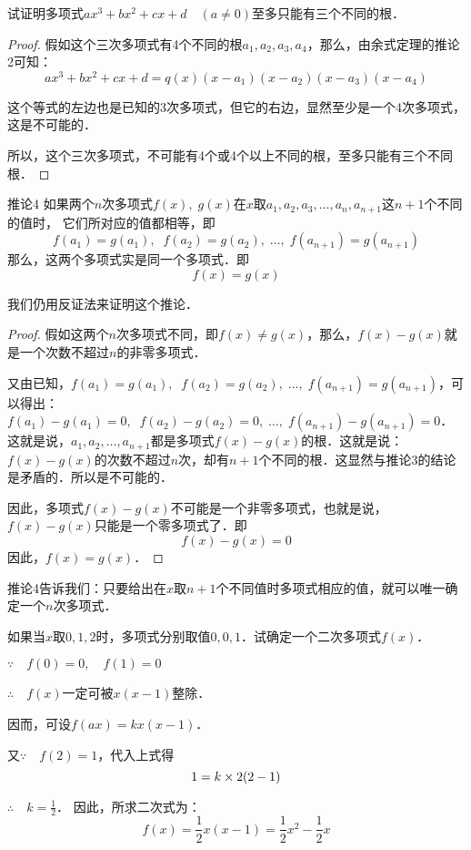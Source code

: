 \begin{example}
    试证明多项式$ax^3+bx^2+cx+d\quad (a\ne 0)$至多只能有三个不同的根．
\end{example}


\begin{proof}
    假如这个三次多项式有4个不同的根$a_1,a_2,a_3,a_4$，那么，由余式定理的推论2可知：
\[ax^3+bx^2+cx+d=q (x) (x-a_1) (x-a_2) (x-a_3) (x-a_4)\]

这个等式的左边也是已知的3次多项式，但它的右边，显然至少是一个4次多项式，这是不可能的．

所以，这个三次多项式，不可能有4个或4个以上不同的根，至多只能有三个不同根．
\end{proof}


\begin{blk}{推论4}
    如果两个$n$次多项式$f(x),\; g(x)$在$x$取$a_1,a_2,a_3,\ldots,a_n,a_{n+1}$这$n+1$个不同的值时，
    它们所对应的值都相等，即
\[f (a_1) =g (a_1) ,\; \; f (a_2) =g (a_2) ,\;  \ldots,\;  f (a_{n+1}) =g (a_{n+1}) \]
那么，这两个多项式实是同一个多项式．即
\[f (x) =g (x) \]
\end{blk}

我们仍用反证法来证明这个推论．

\begin{proof}
假如这两个$n$次多项式不同，即$f(x)\ne g(x)$，那么，$f(x)-g(x)$就是一个次数不超过$n$的非零多项式．

又由已知，$f (a_1) =g (a_1) ,\; \; f (a_2) =g (a_2) ,\;  \ldots,\;  f (a_{n+1}) =g (a_{n+1})$，可以得出：$f (a_1) -g (a_1)=0 ,\; \; f (a_2) -g (a_2)=0 ,\;  \ldots,\;  f (a_{n+1}) -g (a_{n+1})=0$．这就是说，$a_1,a_2,\ldots,a_{n+1}$都是多项式$f(x)-g(x)$的根．这就是说：$f(x)-g(x)$的次数不超过$n$次，却有$n+1$个不同的根．这显然与推论3的结论是矛盾的．所以是不可能的．

因此，多项式$f(x)-g(x)$不可能是一个非零多项式，也就是说，$f(x)-g(x)$只能是一个零多项式了．即
\[f (x) -g (x) =0\]
因此，$f(x)=g(x)$．

\end{proof}

推论4告诉我们：只要给出在$x$取$n+1$个不同值时多项式相应的值，就可以唯一确定一个$n$次多项式．

\begin{example}
如果当$x$取$0, 1, 2$时，多项式分别取值$0,0,1$．试确定一个二次多项式$f(x)$．
\end{example}


\begin{solution}
$\because\quad f(0)=0,\quad f(1)=0$

$\therefore\quad f(x)$一定可被$x(x-1)$整除．

因而，可设$f(ax)=kx(x-1)$．

又$\because\quad f(2)=1$，代入上式得
\[1=k\times2 (2-1) \]

$\therefore\quad k=\frac{1}{2}$．
因此，所求二次式为：
\[f(x)=\frac{1}{2}x(x-1)=\frac{1}{2}x^2-\frac{1}{2}x\]
\end{solution}

